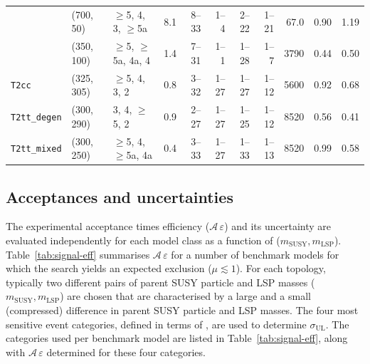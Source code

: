 \begin{table}[!t]
{\begin{tabular}{ lllcrrrrrcc }
    & (700, 50)   & $\geq$5, 4, 3, $\geq$5a  & \phantom{1}8.1 & 8--33  & 1--4     & 2--22  & 1--21 & 67.0 & 0.90 & 1.19 \\
    & (350, 100)  & $\geq$5, $\geq$5a, 4a, 4 & \phantom{1}1.4 & 7--31  & 1--1     & 1--28  & 1--7  & 3790 & 0.44 & 0.50 \\ [0.5ex]
      \multirow{1}{*}{\texttt{T2cc}}
    & (325, 305)  & $\geq$5, 4, 3, 2         & \phantom{1}0.8 & 3--32  & 1--27    & 1--27  & 1--12 & 5600 & 0.92 & 0.68 \\ [0.5ex]
      \multirow{1}{*}{\texttt{T2tt\_degen}}
    & (300, 290)  & 3, 4, $\geq$5, 2         & \phantom{1}0.9 & 2--27  & 1--27    & 1--25  & 1--12 & 8520 & 0.56 & 0.41 \\ [0.5ex]
      \multirow{1}{*}{\texttt{T2tt\_mixed}}
    & (300, 250)  & $\geq$5, 4, $\geq$5a, 4a & \phantom{1}0.4 & 3--33  & 1--27    & 1--33  & 1--13 & 8520 & 0.99 & 0.58 \\ [0.5ex]
      \hline
    \end{tabular}
  }
\end{table}

\subsection{Acceptances and uncertainties}

The experimental acceptance times efficiency
($\mathcal{A}\,\varepsilon$) and its uncertainty are evaluated
independently for each model class as a function of ($m_\text{SUSY},
m_\text{LSP}$). Table~\ref{tab:signal-eff} summarises
$\mathcal{A}\,\varepsilon$ for a number of benchmark models for
which the search yields an expected exclusion ($\mu \lesssim 1$). For
each topology, typically two different pairs of parent SUSY particle and
LSP masses ($m_\text{SUSY}, m_\text{LSP}$) are chosen that are
characterised by a large and a small (\ie compressed) difference
in parent SUSY particle and LSP masses. The four most sensitive event
categories, defined in terms of \njet, are used to determine
$\sigma_\text{UL}$. The categories used per benchmark model are listed
in Table~\ref{tab:signal-eff}, along with
$\mathcal{A}\,\varepsilon$ determined for these four categories.

